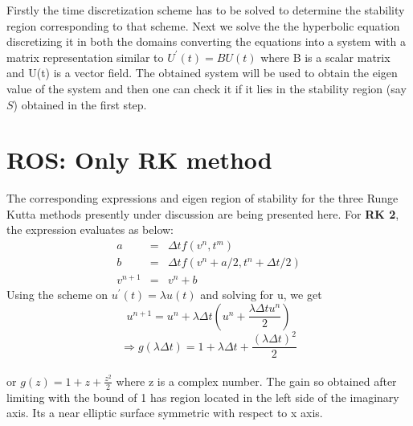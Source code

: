 \documentclass[a4paper,12pt]{report}
\begin{document}
Firstly the time discretization scheme has to be solved to determine the stability region corresponding to that scheme. Next we solve the the hyperbolic equation discretizing it in both the domains converting the equations into a system with a matrix representation similar to $U^{\prime}(t) = BU(t)$ where B is a scalar matrix and U(t) is a vector field. The obtained system will be used to obtain the eigen value of the system and then one can check it if it lies in the stability region (say $S$) obtained in the first step.
\section{ROS: Only RK method }
The corresponding expressions and eigen region of stability for the three Runge Kutta methods presently under discussion are being presented here.
\newline For \textbf{RK 2}, the expression evaluates as below:
\begin{eqnarray}
a&=&\Delta t f(v^n,t^m) \nonumber \\
b&=&\Delta t f(v^n+a/2,t^n+\Delta t/2) \nonumber \\
v^{n+1} &=& v^n+ b \nonumber
\end{eqnarray}
Using the scheme on $u^{\prime}(t)=\lambda u(t)$ and solving for u, we get
\[u^{n+1}=u^n+\lambda \Delta t (u^n+\frac{\lambda \Delta t u^n}{2})\]
\[\Rightarrow g(\lambda \Delta t)  = 1+\lambda \Delta t + \frac{(\lambda \Delta t)^2}{2}\]
\\ or $g(z)  = 1+z + \frac{z^2}{2}$ where z is a complex number. The gain so obtained after limiting with the bound of 1 has region located in the left side of the imaginary axis. Its a near elliptic surface symmetric with respect to x axis. 
\end{document}
